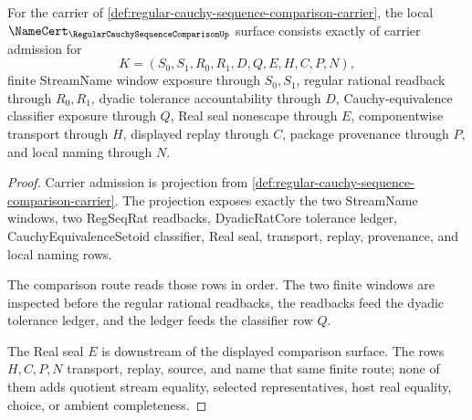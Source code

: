 \begin{theorem}
\label{thm:regular-cauchy-sequence-comparison-namecert-obligations}
For the carrier of \autoref{def:regular-cauchy-sequence-comparison-carrier}, the local $\NameCert_{\RegularCauchySequenceComparisonUp}$ surface consists exactly of carrier admission for
$$
K=(S_0,S_1,R_0,R_1,D,Q,E,H,C,P,N),
$$
finite StreamName window exposure through $S_0,S_1$, regular rational readback through $R_0,R_1$, dyadic tolerance accountability through $D$, Cauchy-equivalence classifier exposure through $Q$, Real seal nonescape through $E$, componentwise transport through $H$, displayed replay through $C$, package provenance through $P$, and local naming through $N$.
\end{theorem}
\begin{proof}
Carrier admission is projection from \autoref{def:regular-cauchy-sequence-comparison-carrier}. The projection exposes exactly the two StreamName windows, two RegSeqRat readbacks, DyadicRatCore tolerance ledger, CauchyEquivalenceSetoid classifier, Real seal, transport, replay, provenance, and local naming rows.

The comparison route reads those rows in order. The two finite windows are inspected before the regular rational readbacks, the readbacks feed the dyadic tolerance ledger, and the ledger feeds the classifier row $Q$.

The Real seal $E$ is downstream of the displayed comparison surface. The rows $H,C,P,N$ transport, replay, source, and name that same finite route; none of them adds quotient stream equality, selected representatives, host real equality, choice, or ambient completeness.
\end{proof}

